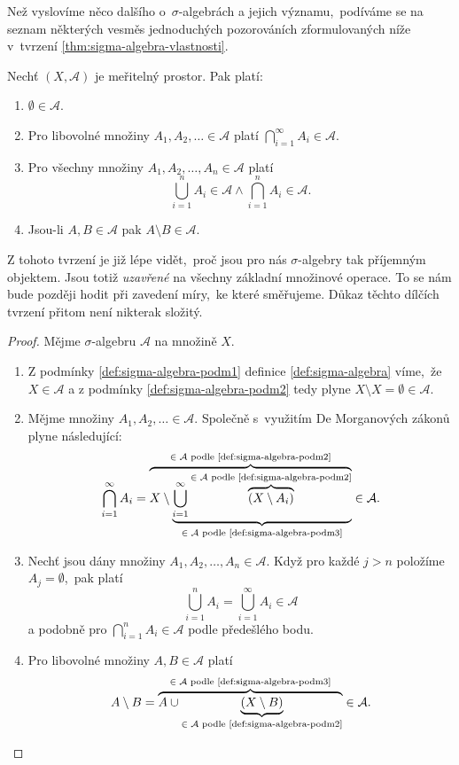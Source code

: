 Než vyslovíme něco dalšího o~$\sigma$-algebrách a jejich významu,~podíváme se na seznam některých vesměs jednoduchých pozorováních zformulovaných níže v~tvrzení \ref{thm:sigma-algebra-vlastnosti}.
\begin{theorem}\label{thm:sigma-algebra-vlastnosti}
    Nechť $(X,\mathcal{A})$ je meřitelný prostor. Pak platí:
    \begin{enumerate}[label=(\roman*)]
        \item $\emptyset\in\mathcal{A}$.
        \item Pro libovolné množiny $A_1,A_2,\ldots\in\mathcal{A}$ platí $\bigcap_{i=1}^\infty A_i\in\mathcal{A}$.
        \item Pro všechny množiny $A_1,A_2,\ldots,A_n\in\mathcal{A}$ platí
        \[\bigcup_{i=1}^n A_i\in\mathcal{A}\land\bigcap_{i=1}^n A_i\in\mathcal{A}.\]
        \item Jsou-li $A,B\in\mathcal{A}$ pak $A\setminus B\in\mathcal{A}$.
    \end{enumerate}
\end{theorem}

Z tohoto tvrzení je již lépe vidět,~proč jsou pro nás $\sigma$-algebry tak příjemným objektem. Jsou totiž \emph{uzavřené} na všechny základní množinové operace. To se nám bude později hodit při zavedení míry,~ke které směřujeme. Důkaz těchto dílčích tvrzení přitom není nikterak složitý.
\begin{proof}
    Mějme $\sigma$-algebru $\mathcal{A}$ na množině $X$.
    \begin{enumerate}[label=\textit{(\roman*)}]
        \item Z podmínky \ref{def:sigma-algebra-podm1} definice \ref{def:sigma-algebra} víme,~že $X\in\mathcal{A}$ a z podmínky \ref{def:sigma-algebra-podm2} tedy plyne $X\setminus X=\emptyset\in\mathcal{A}$.
        \item Mějme množiny $A_1,A_2,\ldots\in\mathcal{A}$. Společně s~využitím De Morganových zákonů plyne následující:
        \[\bigcap\limits_{i=1}^\infty A_i=\overbrace{X\setminus\underbrace{\bigcup\limits_{i=1}^\infty \overbrace{(X\setminus A_i)}^{\text{$\in\mathcal{A}$ podle \ref{def:sigma-algebra-podm2}}}}_{\text{$\in\mathcal{A}$ podle \ref{def:sigma-algebra-podm3}}}}^\text{$\in\mathcal{A}$ podle \ref{def:sigma-algebra-podm2}}\in\mathcal{A}.\]
        \item Nechť jsou dány množiny $A_1,A_2,\ldots,A_n\in\mathcal{A}$. Když pro každé $j>n$ položíme $A_j=\emptyset$,~pak platí
        \[\bigcup\limits_{i=1}^n A_i=\bigcup\limits_{i=1}^\infty A_i\in\mathcal{A}\]
        a podobně pro $\bigcap_{i=1}^n A_i\in\mathcal{A}$ podle předešlého bodu.
        \item Pro libovolné množiny $A,B\in\mathcal{A}$ platí
        \[A\setminus B=\overbrace{A\cup\underbrace{(X\setminus B)}_{\text{$\in\mathcal{A}$ podle \ref{def:sigma-algebra-podm2}}}}^{\text{$\in\mathcal{A}$ podle \ref{def:sigma-algebra-podm3}}}\in\mathcal{A}.\]
    \end{enumerate}
\end{proof}

